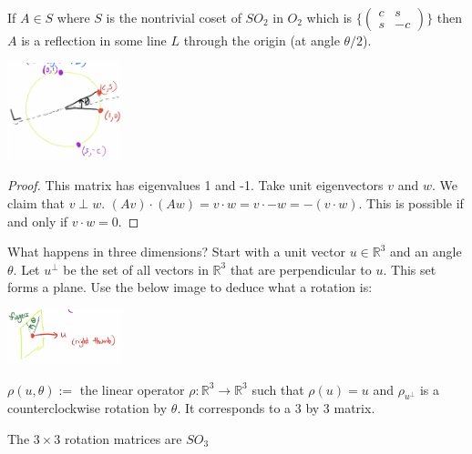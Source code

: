 \documentclass{article}
\newcommand{\R}{\mathbb{R}}
\newcommand{\ra}[1][]{\xrightarrow{#1}}
\begin{document}
\begin{proposition}
If $A\in S$ where $S$ is the nontrivial coset of $SO_2$ in $O_2$ which is $\{\begin{pmatrix}
c&s\\s&-c
\end{pmatrix}\}$ then $A$ is a reflection in some line $L$ through the origin (at angle $\theta/2$).
    \begin{center}
        \includegraphics[width=0.25\textwidth]{Image 1 9252020.PNG}
    \end{center}
\end{proposition}
\begin{proof}
This matrix has eigenvalues 1 and -1. Take unit eigenvectors $v$ and $w$. We claim that $v\perp w$. $(Av)\cdot (Aw)=v\cdot w=v\cdot -w=-(v\cdot w)$. This is possible if and only if $v\cdot w=0$.
\end{proof}
What happens in three dimensions? Start with a unit vector $u\in \R^3$ and an angle $\theta$. Let $u^\perp$ be the set of all vectors in $\R^3$ that are perpendicular to $u$. This set forms a plane. Use the below image to deduce what a rotation is:
    \begin{center}
        \includegraphics[width=0.25\textwidth]{Image 2 9252020.PNG}
    \end{center}
$\rho(u,\theta):=$ the linear operator $\rho:\R^3\ra\R^3$ such that $\rho(u)=u$ and $\rho_{u^\perp}$ is a counterclockwise rotation by $\theta$. It corresponds to a 3 by 3 matrix.
\begin{theorem}
The $3\times 3$ rotation matrices are $SO_3$
\end{theorem}
\end{document}
